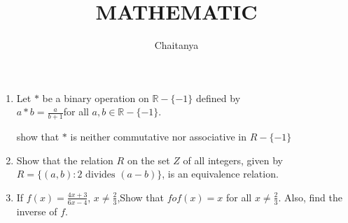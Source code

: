 \documentclass[12pt,-letter paper]{article}
\title{\textbf{MATHEMATIC}}
\author{Chaitanya}
\begin{document}
\maketitle
\begin{enumerate}
\item Let $*$ be a binary operation on $\mathbb{R} - \{-1\}$ defined by\\    
$a * b = \frac{a}{b + 1}$for all $a, b \in \mathbb{R} - \{-1\}$.
                                                                                                
show that $*$ is neither commutative nor associative in ${R} - \{-1\}$
\item Show that the relation $R$ on the set $Z$ of all integers, given by $R = \{(a, b):2 \text{ divides } (a - b)\}$, is an equivalence relation.
\item If $f(x) = \frac{4x + 3}{6x - 4}$, $x \neq \frac{2}{3}$,Show that $fof(x) = x$ for all $x \neq \frac{2}{3}$. Also, find the inverse of $f$.
\end{enumerate}
\end{document}
